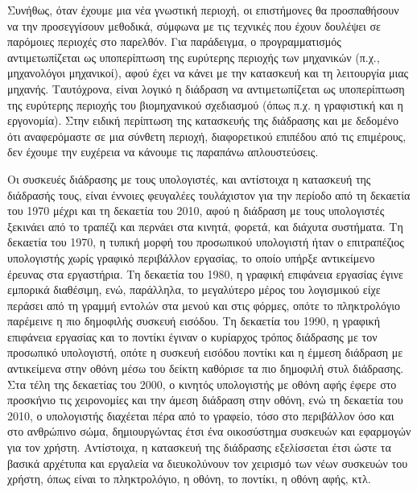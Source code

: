 \documentclass[
]{article}
\begin{document}
Συνήθως, όταν έχουμε μια νέα γνωστική περιοχή, οι επιστήμονες θα
προσπαθήσουν να την προσεγγίσουν μεθοδικά, σύμφωνα με τις τεχνικές που
έχουν δουλέψει σε παρόμοιες περιοχές στο παρελθόν. Για παράδειγμα, ο
προγραμματισμός αντιμετωπίζεται ως υποπερίπτωση της ευρύτερης περιοχής
των μηχανικών (π.χ., μηχανολόγοι μηχανικοί), αφού έχει να κάνει με την
κατασκευή και τη λειτουργία μιας μηχανής. Ταυτόχρονα, είναι λογικό η
διάδραση να αντιμετωπίζεται ως υποπερίπτωση της ευρύτερης περιοχής του
βιομηχανικού σχεδιασμού (όπως π.χ. η γραφιστική και η εργονομία). Στην
ειδική περίπτωση της κατασκευής της διάδρασης και με δεδομένο ότι
αναφερόμαστε σε μια σύνθετη περιοχή, διαφορετικού επιπέδου από τις
επιμέρους, δεν έχουμε την ευχέρεια να κάνουμε τις παραπάνω
απλουστεύσεις.

Οι συσκευές διάδρασης με τους υπολογιστές, και αντίστοιχα η κατασκευή
της διάδρασής τους, είναι έννοιες φευγαλέες τουλάχιστον για την περίοδο
από τη δεκαετία του 1970 μέχρι και τη δεκαετία του 2010, αφού η διάδραση
με τους υπολογιστές ξεκινάει από το τραπέζι και περνάει στα κινητά,
φορετά, και διάχυτα συστήματα. Tη δεκαετία του 1970, η τυπική μορφή του
προσωπικού υπολογιστή ήταν ο επιτραπέζιος υπολογιστής χωρίς γραφικό
περιβάλλον εργασίας, το οποίο υπήρξε αντικείμενο έρευνας στα εργαστήρια.
Τη δεκαετία του 1980, η γραφική επιφάνεια εργασίας έγινε εμπορικά
διαθέσιμη, ενώ, παράλληλα, το μεγαλύτερο μέρος του λογισμικού είχε
περάσει από τη γραμμή εντολών στα μενού και στις φόρμες, οπότε το
πληκτρολόγιο παρέμεινε η πιο δημοφιλής συσκευή εισόδου. Τη δεκαετία του
1990, η γραφική επιφάνεια εργασίας και το ποντίκι έγιναν ο κυρίαρχος
τρόπος διάδρασης με τον προσωπικό υπολογιστή, οπότε η συσκευή εισόδου
ποντίκι και η έμμεση διάδραση με αντικείμενα στην οθόνη μέσω του δείκτη
καθόρισε τα πιο δημοφιλή στυλ διάδρασης. Στα τέλη της δεκαετίας του
2000, ο κινητός υπολογιστής με οθόνη αφής έφερε στο προσκήνιο τις
χειρονομίες και την άμεση διάδραση στην οθόνη, ενώ τη δεκαετία του 2010,
ο υπολογιστής διαχέεται πέρα από το γραφείο, τόσο στο περιβάλλον όσο και
στο ανθρώπινο σώμα, δημιουργώντας έτσι ένα οικοσύστημα συσκευών και
εφαρμογών για τον χρήστη. Αντίστοιχα, η κατασκευή της διάδρασης
εξελίσσεται έτσι ώστε τα βασικά αρχέτυπα και εργαλεία να διευκολύνουν
τον χειρισμό των νέων συσκευών του χρήστη, όπως είναι το πληκτρολόγιο, η
οθόνη, το ποντίκι, η οθόνη αφής, κτλ.
\end{document}
